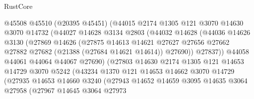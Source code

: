 \begin{lexlean}{RustCore}
\begin{coremodule}
                        @45508
                        @45510
                        (@20395 @45451)
                        (@44015
                          @2174
                          @1305
                          @121
                          @3070
                          @14630
                          @3070
                          @14732
                          (@44027
                            @14628
                            @3134
                            @2803
                            (@44032
                              @14628
                              (@44036
                                @14626
                                @3130
                                (@27869
                                  @14626
                                  (@27875
                                    @14613
                                    @14621
                                    @27627
                                    @27656
                                    @27662
                                    @27882
                                    @27682
                                    (@21388 (@27684 @14621 @14614))
                                    @27690))
                                @27837))
                            @44058
                            @44061
                            @44064
                            @44067
                            @27690)
                          (@27803
                            @14630
                            @2174
                            @1305
                            @121
                            @14653
                            @14729
                            @3070
                            @5242
                            (@43234
                              @1370
                              @121
                              @14653
                              @14662
                              @3070
                              @14729
                              (@27935
                                @14653
                                @14660
                                @3240
                                (@27943
                                  @14652
                                  @14659
                                  @3095
                                  @14635
                                  @3064
                                  @27958
                                  (@27967
                                    @14645
                                    @3064
                                    @27973

\end{coremodule}
\end{lexlean}
